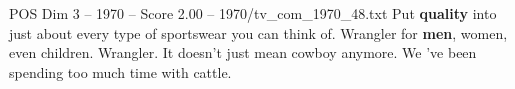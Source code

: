 \begin{textsample}{POS Dim 3 – 1970 – Score 2.00 – 1970/tv\_com\_1970\_48.txt}  \label{ex:f3_pos_036}
Put \textbf{quality} into just about every type of sportswear you can think of.
Wrangler for \textbf{men}, women, even children.
Wrangler.
It doesn't just mean cowboy anymore.
We 've been spending too much time with cattle.

\end{textsample}
